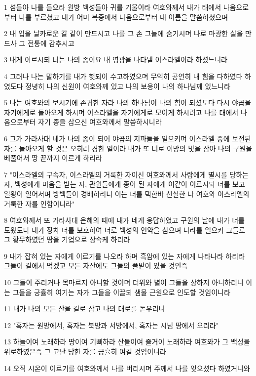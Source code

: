 \par 1 섬들아 나를 들으라 원방 백성들아 귀를 기울이라 여호와께서 내가 태에서 나옴으로부터 나를 부르셨고 내가 어미 복중에서 나옴으로부터 내 이름을 말씀하셨으며
\par 2 내 입을 날카로운 칼 같이 만드시고 나를 그 손 그늘에 숨기시며 나로 마광한 살을 만드사 그 전통에 감추시고
\par 3 내게 이르시되 너는 나의 종이요 내 영광을 나타낼 이스라엘이라 하셨느니라
\par 4 그러나 나는 말하기를 내가 헛되이 수고하였으며 무익히 공연히 내 힘을 다하였다 하였도다 정녕히 나의 신원이 여호와께 있고 나의 보응이 나의 하나님께 있느니라
\par 5 나는 여호와의 보시기에 존귀한 자라 나의 하나님이 나의 힘이 되셨도다 다시 야곱을 자기에게로 돌아오게 하시며 이스라엘을 자기에게로 모이게 하시려고 나를 태에서 나옴으로부터 자기 종을 삼으신 여호와께서 말씀하시니라
\par 6 그가 가라사대 네가 나의 종이 되어 야곱의 지파들을 일으키며 이스라엘 중에 보전된 자를 돌아오게 할 것은 오히려 경한 일이라 내가 또 너로 이방의 빛을 삼아 나의 구원을 베풀어서 땅 끝까지 이르게 하리라
\par 7 "이스라엘의 구속자, 이스라엘의 거룩한 자이신 여호와께서 사람에게 멸시를 당하는 자, 백성에게 미움을 받는 자, 관원들에게 종이 된 자에게 이같이 이르시되 너를 보고 열왕이 일어서며 방백들이 경배하리니 이는 너를 택한바 신실한 나 여호와 이스라엘의 거룩한 자를 인함이니라"
\par 8 여호와께서 또 가라사대 은혜의 때에 내가 네게 응답하였고 구원의 날에 내가 너를 도왔도다 내가 장차 너를 보호하여 너로 백성의 언약을 삼으며 나라를 일으켜 그들로 그 황무하였던 땅을 기업으로 상속케 하리라
\par 9 내가 잡혀 있는 자에게 이르기를 나오라 하며 흑암에 있는 자에게 나타나라 하리라 그들이 길에서 먹겠고 모든 자산에도 그들의 풀밭이 있을 것인즉
\par 10 그들이 주리거나 목마르지 아니할 것이며 더위와 볕이 그들을 상하지 아니하리니 이는 그들을 긍휼히 여기는 자가 그들을 이끌되 샘물 근원으로 인도할 것임이니라
\par 11 내가 나의 모든 산을 길로 삼고 나의 대로를 돋우리니
\par 12 "혹자는 원방에서, 혹자는 북방과 서방에서, 혹자는 시님 땅에서 오리라"
\par 13 하늘이여 노래하라 땅이여 기뻐하라 산들이여 즐거이 노래하라 여호와가 그 백성을 위로하였은즉 그 고난 당한 자를 긍휼히 여길 것임이니라
\par 14 오직 시온이 이르기를 여호와께서 나를 버리시며 주께서 나를 잊으셨다 하였거니와
